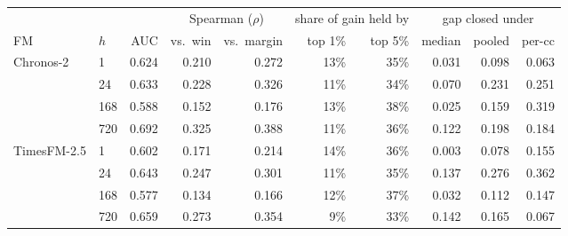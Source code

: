 \begin{tabular}{llrrrrrrrr}
\toprule
& & & \multicolumn{2}{c}{Spearman ($\rho$)} & \multicolumn{2}{c}{share of gain held by} & \multicolumn{3}{c}{gap closed under} \\
\cmidrule(lr){4-5}\cmidrule(lr){6-7}\cmidrule(lr){8-10}
FM & $h$ & AUC & vs.\ win & vs.\ margin & top 1\% & top 5\% & median & pooled & per-cc \\
\midrule
\multirow{4}{*}{Chronos-2}
 & 1 & 0.624 & 0.210 & 0.272 & 13\% & 35\% & 0.031 & 0.098 & 0.063 \\
 & 24 & 0.633 & 0.228 & 0.326 & 11\% & 34\% & 0.070 & 0.231 & 0.251 \\
 & 168 & 0.588 & 0.152 & 0.176 & 13\% & 38\% & 0.025 & 0.159 & 0.319 \\
 & 720 & 0.692 & 0.325 & 0.388 & 11\% & 36\% & 0.122 & 0.198 & 0.184 \\
\midrule
\multirow{4}{*}{TimesFM-2.5}
 & 1 & 0.602 & 0.171 & 0.214 & 14\% & 36\% & 0.003 & 0.078 & 0.155 \\
 & 24 & 0.643 & 0.247 & 0.301 & 11\% & 35\% & 0.137 & 0.276 & 0.362 \\
 & 168 & 0.577 & 0.134 & 0.166 & 12\% & 37\% & 0.032 & 0.112 & 0.147 \\
 & 720 & 0.659 & 0.273 & 0.354 & 9\% & 33\% & 0.142 & 0.165 & 0.067 \\
\bottomrule
\end{tabular}
